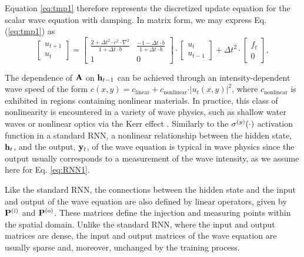 Equation \ref{eq:tmp1} therefore represents the discretized update equation for the scalar wave equation with damping. In matrix form, we may express Eq. (\ref{eq:tmp1}) as
\begin{equation}
    \begin{bmatrix}
    u_{t+1} \\ u_t
    \end{bmatrix}
    = 
    \begin{bmatrix}
    \frac{2 + \Delta t^2\cdot c^2 \cdot \nabla^2}{1 + \Delta t\cdot b} 
    & \frac{-1 - \Delta t\cdot b}{1 + \Delta t\cdot b}  \\
    1 & 0
    \end{bmatrix}
    \cdot
    \begin{bmatrix}
    u_{t} \\ u_{t-1}
    \end{bmatrix}    
    +
    \Delta{t}^2 \cdot \begin{bmatrix}
     f_{t} \\ 0
    \end{bmatrix},
    \label{eq:update_damped}
\end{equation}

The dependence of $\mathbf{A}$ on $\mathbf{h}_{t-1}$ can be achieved through an intensity-dependent wave speed of the form $c{(x,y)} = c_{\text{linear}} + c_{\text{nonlinear}} \cdot \vert u_t{(x,y)} \vert^2$, where $c_{\text{nonlinear}}$ is exhibited in regions containing nonlinear materials.
In practice, this class of nonlinearity is encountered in a variety of wave physics, such as shallow water waves \cite{ursell_long-wave_1953} or nonlinear optics via the Kerr effect \cite{boyd_nonlinear_2008}. 
Similarly to the $\sigma^{(y)}(\cdot)$ activation function in a standard RNN, a nonlinear relationship between the hidden state, $\mathbf{h}_t$, and the output, $\mathbf{y}_t$, of the wave equation is typical in wave physics since the output usually corresponds to a measurement of the wave intensity, as we assume here for Eq. \ref{eq:RNN1}. 

Like the standard RNN, the connections between the hidden state and the input and output of the wave equation are also defined by linear operators, given by $\mathbf{P}^{(\textrm{i})}$ and $\mathbf{P}^{(\textrm{o})}$. 
These matrices define the injection and measuring points within the spatial domain.
Unlike the standard RNN, where the input and output matrices are dense, the input and output matrices of the wave equation are usually sparse and, moreover, unchanged by the training process.


